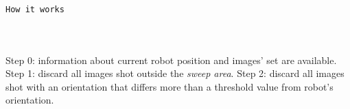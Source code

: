 {\begin{block} {\alert{\texttt{How it works}}}
\begin{columns}
{{\begin{center}
          \end{center}
        }
      }
      
       {
      }
      
    \end{columns}

    \vskip8pt
    
    \footnotesize{
       {\alert{Step 0}: information about current robot position and images' set are
      available.}
       {\alert{Step 1}: discard all images shot outside the \textit{sweep area}.}
       {\alert{Step 2}: discard all images shot with an orientation that differs more
        than a threshold value from robot's orientation.}
     
    }
  \end{block}
}

